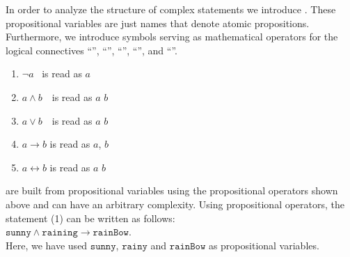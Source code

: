 In order to analyze the structure of complex statements we introduce
.
These propositional variables are just names that denote atomic propositions.
Furthermore, we introduce symbols serving as mathematical operators for the logical connectives
``'', ``'', ``'', ``'', and 
``''.
\begin{enumerate}
\item $\neg a$ \quad\quad\ is read as \quad {} $a$ 
      \vspace*{-0.2cm}

\item $a \wedge b$ \,\quad\ is read as \quad $a$  $b$
      \vspace*{-0.2cm}

\item $a \vee b$ \,\quad\ is read as \quad $a$  $b$
      \vspace*{-0.2cm}

\item $a \rightarrow b$   \quad is read as \quad {} $a$,  $b$
      \vspace*{-0.2cm}

\item $a \leftrightarrow b$  \quad is read as \quad  $a$  $b$
\end{enumerate}
 are built from propositional variables using the propositional operators shown
above and can have an arbitrary complexity.
Using propositional operators, the statement (1) can be written as follows:
 \\[0.2cm]
\hspace*{1.3cm}
$\texttt{sunny} \wedge \texttt{raining} \rightarrow \texttt{rainBow}$.
\\[0.2cm]
Here, we have used  $\texttt{sunny}$, $\texttt{rainy}$ and $\texttt{rainBow}$ as propositional variables.

